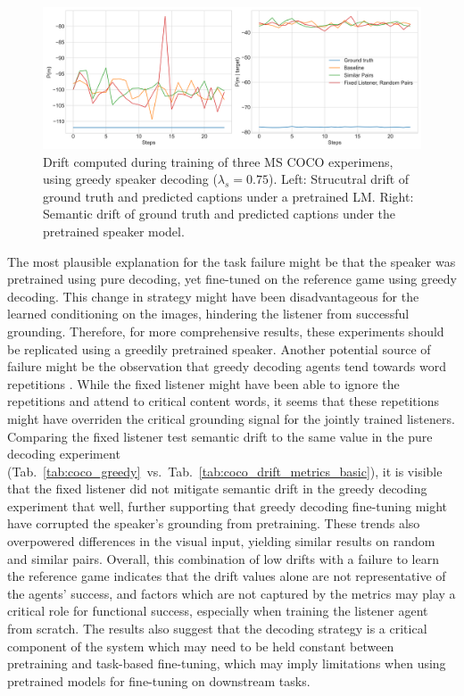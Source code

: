 \begin{figure}
	\centering
	\includegraphics[width=\linewidth]{images/coco_structural_semantic_drift_greedy_all_4000_pure_075.png}
	\caption{Drift computed during training of three MS COCO experimens, using greedy speaker decoding ($\lambda_s = 0.75$). Left: Strucutral drift of ground truth and predicted captions under a pretrained LM. Right: Semantic drift of ground truth and predicted captions under the pretrained speaker model.}
	\label{fig:coco_greedy_drifts}
\end{figure} 

The most plausible explanation for the task failure might be that the speaker was pretrained using pure decoding, yet fine-tuned on the reference game using greedy decoding. This change in strategy might have been disadvantageous for the learned conditioning on the images, hindering the listener from successful grounding. Therefore, for more comprehensive results, these experiments should be replicated using a greedily pretrained speaker. Another potential source of failure might be the observation that greedy decoding agents tend towards word repetitions \parencite[cf.][]{lee2019countering}. While the fixed listener might have been able to ignore the repetitions and attend to critical content words, it seems that these repetitions might have overriden the critical grounding signal for the jointly trained listeners. Comparing the fixed listener test semantic drift to the same value in the pure decoding experiment (Tab.~\ref{tab:coco_greedy}~vs.~Tab.~\ref{tab:coco_drift_metrics_basic}), it is visible that the fixed listener did not mitigate semantic drift in the greedy decoding experiment that well, further supporting that greedy decoding fine-tuning might have corrupted the speaker's grounding from pretraining. 
These trends also overpowered differences in the visual input, yielding similar results on random and similar pairs.
Overall, this combination of low drifts with a failure to learn the reference game indicates that the drift values alone are not representative of the agents' success, and factors which are not captured by the metrics may play a critical role for functional success, especially when training the listener agent from scratch. The results also suggest that the decoding strategy is a critical component of the system which may need to be held constant between pretraining and task-based fine-tuning, which may imply limitations when using pretrained models for fine-tuning on downstream tasks.

